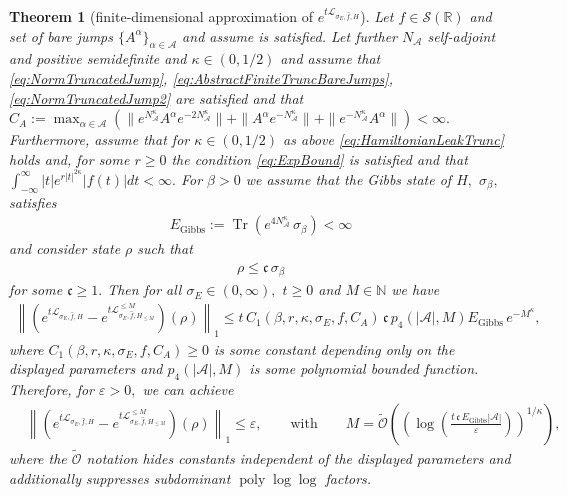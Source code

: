 \documentclass[11pt]{amsart}
\newcommand{\1}{\mathbbm{1}}
\newcommand{\Tr}{\operatorname{Tr}}
\newcommand{\N}{\mathbb{N}}
\newcommand{\cL}{\mathcal{L}}
\newcommand{\eps}{\varepsilon}
\newcommand{\NA}{N_{\mathcal{A}}}
\newcommand{\cA}{\mathcal{A}}
\theoremstyle{plain}
\newtheorem{theorem}{Theorem}[section]
\theoremstyle{definition}
\theoremstyle{remark}
\numberwithin{equation}{section}
\begin{document}
\begin{theorem}[finite-dimensional approximation of $e^{t\cL_{\sigma_E,\widehat f,H}}$]
\label{thm:SchwartzGibbsDynamics}
Let $f\in\mathcal{S}(\mathbb{R})$ and set of bare jumps $\{A^\alpha\}_{\alpha\in\cA}$ and assume   is satisfied. 
Let further $\NA$ self-adjoint and positive semidefinite and $\kappa\in(0,1/2)$ and assume that \eqref{eq:NormTruncatedJump}, \eqref{eq:AbstractFiniteTruncBareJumps}, \eqref{eq:NormTruncatedJump2} are  satisfied and that $C_A := \max_{\alpha\in\cA}\left(\|e^{\NA^{\kappa}}A^{\alpha}e^{-2\NA^{\kappa}}\|+\|A^{\alpha}e^{-\NA^{\kappa}}\|+\|e^{-\NA^{\kappa}}A^{\alpha}\|\right)<\infty.$ 
Furthermore, assume that for $\kappa\in(0,1/2)$ as above \eqref{eq:HamiltonianLeakTrunc} holds and, for some $r\ge 0$ the condition \eqref{eq:ExpBound} is satisfied and that $\int_{-\infty}^{\infty} |t|e^{r|t|^{2\kappa}} |f(t)|dt <\infty.$ 
For $\beta>0$ we assume that the Gibbs state of $H,$ $\sigma_\beta,$ satisfies
\begin{align}E_{\operatorname{Gibbs}}:=\Tr\left(e^{4\NA^\kappa}\, \sigma_\beta\right)<\infty
\end{align}
and consider state $\rho$ such that 
\begin{align}
\label{eq:InputDmaxConstraint}
    \rho \le \mathfrak{c}\,\sigma_\beta
\end{align}
for some $\mathfrak{c}\ge 1.$ Then for all $\sigma_E\in(0,\infty),$ $t\ge 0$ and $M\in\N$ we have
    \begin{align}
\left\|\left(e^{t\cL_{\sigma_E,\widehat f,H}}-e^{t\cL^{\le M}_{\sigma_E,\widehat f,H_{\le M}}}\right)(\rho)\right\|_1\le t\,C_1(\beta,r,\kappa,\sigma_E,f,C_A)\,\mathfrak{c} \,p_4(|\mathcal{A}|,M)E_{\operatorname{Gibbs}}\, e^{-M^\kappa} , 
    \end{align}
    where $C_1(\beta,r,\kappa,\sigma_E,f,C_A)\ge 0$ is some constant depending only on the displayed parameters and $p_4(|\mathcal{A}|,M)$ is some polynomial bounded function. Therefore, for $\eps>0,$ we can achieve
    \begin{align}\label{eq:Metal}
       &\left\|\left(e^{t\cL_{\sigma_E,\widehat f,H}}-e^{t\cL^{\le M}_{\sigma_E,\widehat f,H_{\le M}}}\right)(\rho)\right\|_1\le \eps,\qquad\text{with}\qquad M = \widetilde{\mathcal{O}} \left(\left(\log\left(\frac{t\,\mathfrak{c}\,E_{\operatorname{Gibbs}}|\cA|}{ \eps}\right)\right)^{1/\kappa}\right),
    \end{align}
    where the $\widetilde{\mathcal{O}}$ notation hides constants independent of the displayed parameters and additionally suppresses subdominant $\operatorname{poly}\log\log$ factors.
\end{theorem}
\end{document}

